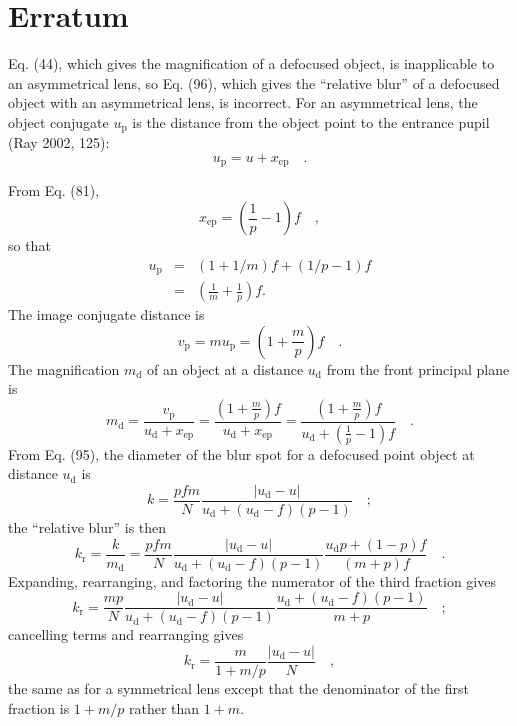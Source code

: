 \documentclass[11pt, oneside]{scrartcl}   	%
\begin{document}
\appendix
\section{Erratum}

Eq. (44), which gives the magnification of a defocused object, is
inapplicable to an asymmetrical lens, so Eq. (96), which gives the
``relative blur'' of a defocused object with an asymmetrical lens, is incorrect.
For an asymmetrical lens, the object conjugate $u_\mathrm{p}$ is the distance from the object point to the entrance pupil (Ray 2002, 125):
\begin{equation}
u_\mathrm{p} = u + x_\mathrm{ep}\quad .
\end{equation}

From Eq. (81),
\begin{equation}
x_\mathrm{ep} =\left(\frac{1}{p}-1\right)f\quad,
\end{equation}
so that
\begin{eqnarray}
u_\mathrm{p} &=&(1+1/m)f+ (1/p - 1)f\\
& = &\left(\frac{1}{m} + \frac{1}{p}\right)f.
\end{eqnarray}
The image conjugate distance is
\begin{equation}
v_\mathrm{p} = mu_\mathrm{p}=\left(1+ \frac{m}{p}\right)f\quad.
\end{equation}
The magnification $m_\mathrm{d}$ of an object at a distance $u_\mathrm{d}$ from the front principal plane is
\begin{equation}
  m_\mathrm{d}=\frac{v_\mathrm{p}}{u_\mathrm{d} + x_\mathrm{ep}} = \frac{(1+\frac{m}{p})f}{ u_\mathrm{d} + x_\mathrm{ep}} = \frac{(1+\frac{m}{p})f}{u_\mathrm{d} +(\frac{1}{p}-1)f} \quad.
\end{equation}
From Eq. (95), the diameter of the blur spot for a defocused point
object at distance $u_\mathrm{d}$ is
\begin{equation}
  \label{eq:a6}
  k = \frac{pfm}N\frac{|u_\mathrm{d}-u|}{u_\mathrm{d}+(u_\mathrm{d}-f)(p-1)}\quad;  
\end{equation}
the ``relative blur''  is then
\begin{equation}
  \label{eq:a7}
  k_\mathrm{r} = \frac k{m_\mathrm{d}} = \frac{pfm}N\frac{|u_\mathrm{d}-u|}{u_\mathrm{d}+(u_\mathrm{d}-f)(p-1)}\frac{u_\mathrm{d}p+(1-p)f}{(m+p)f}
  \quad.
\end{equation}
Expanding, rearranging, and factoring the numerator of the third
fraction gives
\begin{equation}
  \label{eq:a8}
   k_\mathrm{r} = \frac{mp}N\frac{|u_\mathrm{d}-u|}{u_\mathrm{d}+(u_\mathrm{d}-f)(p-1)}\frac{u_\mathrm{d}+(u_\mathrm{d}-f)(p-1)}{m+p}\quad;
 \end{equation}
 cancelling terms and rearranging gives
 \begin{equation}
   \label{eq:a9}
   k_\mathrm{r} = \frac m{1+m/p}\frac{|u_\mathrm{d}-u|}N\quad,
 \end{equation}
the same as for a symmetrical lens except that the denominator of the first fraction is $1 + m/p$ rather than $1 + m$.
\end{document}
